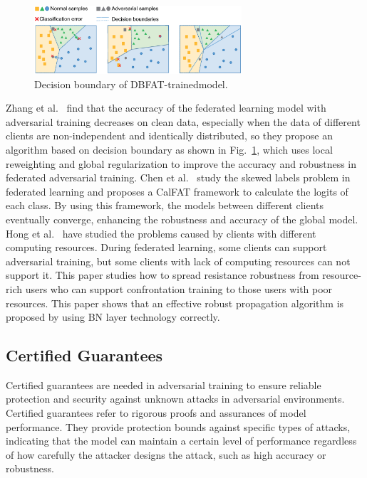 \documentclass[a4paper,fleqn]{cas-dc}
\begin{document}
\begin{figure}[h]
	\centering
	\includegraphics[width=1.0\linewidth,height=1.0in]{output/fig21.eps}
	\caption{Decision boundary of DBFAT-trainedmodel.}
	\label{fig21}
\end{figure}


Zhang et al.~\cite{zhang2023delving} find that the accuracy of the federated
learning model with adversarial training decreases on
clean data, especially when the data of different clients
are non-independent and identically distributed, so they
propose an algorithm based on decision boundary as
shown in Fig.~\ref{fig21}, which uses local reweighting and global
regularization to improve the accuracy and robustness in
federated adversarial training. Chen et al.~\cite{chen2022calfat} study the
skewed labels problem in federated learning and proposes
a CalFAT framework to calculate the logits of each class.
By using this framework, the models between different
clients eventually converge, enhancing the robustness and
accuracy of the global model.
Hong et al.~\cite{hong2021federated} have studied the problems caused
by clients with different computing resources. During
federated learning, some clients can support adversarial
training, but some clients with lack of computing resources
can not support it. This paper studies how to spread
resistance robustness from resource-rich users who can
support confrontation training to those users with poor
resources. This paper shows that an effective robust
propagation algorithm is proposed by using BN layer
technology correctly.

\subsection{Certified Guarantees}
Certified guarantees are needed in adversarial training
to ensure reliable protection and security against unknown
attacks in adversarial environments. Certified guarantees
refer to rigorous proofs and assurances of model
performance. They provide protection bounds against specific
types of attacks, indicating that the model can maintain
a certain level of performance regardless of how carefully
the attacker designs the attack, such as high accuracy or
robustness.
\end{document}
